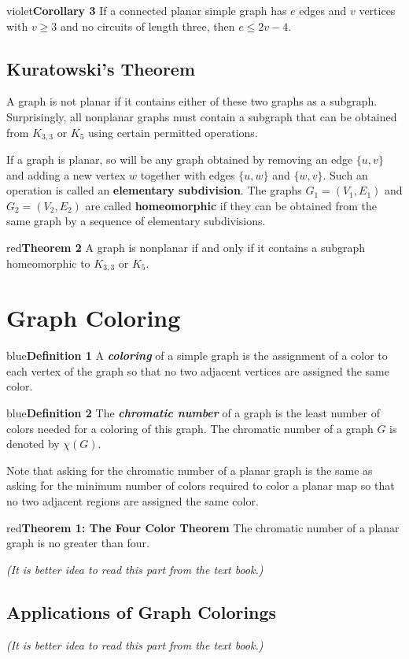 \documentclass[11pt]{article}
\newenvironment{definition}[1]{\begin{mybox}{blue}{\textbf{Definition #1}}}{\end{mybox}}
\newenvironment{theorem}[1]{\begin{mybox}{red}{\textbf{Theorem #1}}}{\end{mybox}}
\begin{document}
\begin{mybox}{violet}{\textbf{Corollary 3}}
If a connected planar simple graph has $e$ edges and $v$ vertices with $v \geq 3$ and no circuits of length three, then $e \leq 2v - 4$.
\end{mybox}

\subsection{Kuratowski’s Theorem}

A graph is not planar if it contains either of these two graphs as a subgraph. Surprisingly, all nonplanar graphs must contain a subgraph that can be obtained from $K_{3,3}$ or $K_5$ using certain permitted operations.

If a graph is planar, so will be any graph obtained by removing an edge $\{u, v\}$ and adding a new vertex $w$ together with edges $\{u, w\}$ and $\{w, v\}$. Such an operation is called an \textbf{elementary subdivision}. The graphs $G_1 = (V_1, E_1)$ and $G_2 = (V_2, E_2)$ are called \textbf{homeomorphic} if they can be obtained from the same graph by a sequence of elementary subdivisions.

\begin{theorem}{2}
A graph is nonplanar if and only if it contains a subgraph homeomorphic to $K_{3,3}$ or $K_5$.
\end{theorem}

\section{Graph Coloring}

\begin{definition}{1}
A \textit{\textbf{coloring}} of a simple graph is the assignment of a color to each vertex of the graph so that no two adjacent vertices are assigned the same color.
\end{definition}

\begin{definition}{2}
The \textit{\textbf{chromatic number}} of a graph is the least number of colors needed for a coloring of this graph. The chromatic number of a graph $G$ is denoted by $\chi(G)$.
\end{definition}

Note that asking for the chromatic number of a planar graph is the same as asking for the minimum number of colors required to color a planar map so that no two adjacent regions are assigned the same color.

\begin{theorem}{1: The Four Color Theorem}
The chromatic number of a planar graph is no greater than four.
\end{theorem}

\textit{(It is better idea to read this part from the text book.)}

\subsection{Applications of Graph Colorings}

\textit{(It is better idea to read this part from the text book.)}
\end{document}
